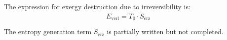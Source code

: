 The expression for exergy destruction due to irreversibility is:  
\[
\dot{E}_{\text{verl}} = T_0 \cdot \dot{S}_{\text{erz}}
\]  

The entropy generation term \( \dot{S}_{\text{erz}} \) is partially written but not completed.